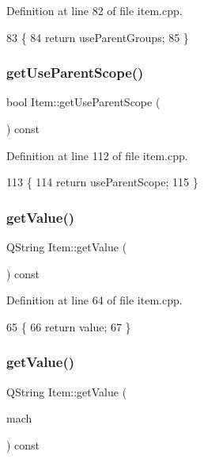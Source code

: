 Definition at line 82 of file item.\+cpp.


\begin{DoxyCode}
83 \{
84     \textcolor{keywordflow}{return} useParentGroups;
85 \}
\end{DoxyCode}
\mbox{\label{class_item_a1c9646660ee2abe8560fe42c2413f376}} 
\subsubsection{\texorpdfstring{get\+Use\+Parent\+Scope()}{getUseParentScope()}}
{\footnotesize\ttfamily bool Item\+::get\+Use\+Parent\+Scope (\begin{DoxyParamCaption}{ }\end{DoxyParamCaption}) const}



Definition at line 112 of file item.\+cpp.


\begin{DoxyCode}
113 \{
114     \textcolor{keywordflow}{return} useParentScope;
115 \}
\end{DoxyCode}
\mbox{\label{class_item_ae6ea1a0f342108797321796acb3c9878}} 
\subsubsection{\texorpdfstring{get\+Value()}{getValue()}\hspace{0.1cm}{\footnotesize\ttfamily [1/2]}}
{\footnotesize\ttfamily Q\+String Item\+::get\+Value (\begin{DoxyParamCaption}{ }\end{DoxyParamCaption}) const}



Definition at line 64 of file item.\+cpp.


\begin{DoxyCode}
65 \{
66     \textcolor{keywordflow}{return} value;
67 \}
\end{DoxyCode}
\mbox{\label{class_item_a171f7fb92445cf2ebbcc39456a499597}} 
\subsubsection{\texorpdfstring{get\+Value()}{getValue()}\hspace{0.1cm}{\footnotesize\ttfamily [2/2]}}
{\footnotesize\ttfamily Q\+String Item\+::get\+Value (\begin{DoxyParamCaption}\item[{Q\+String\+List}]{mach }\end{DoxyParamCaption}) const}



